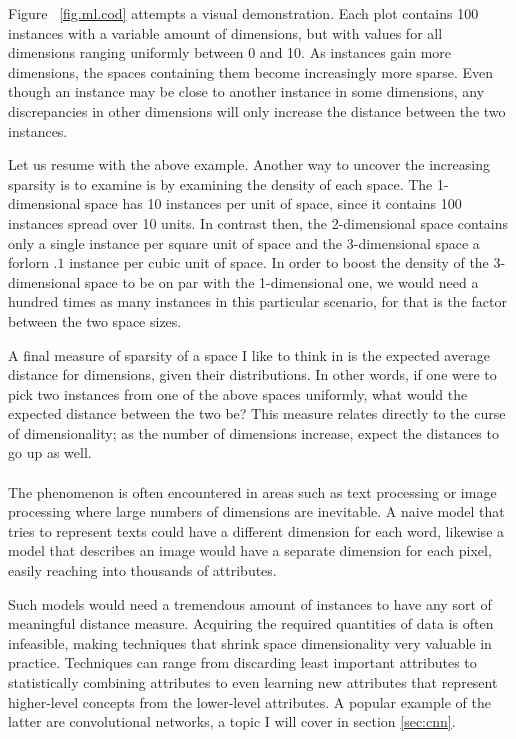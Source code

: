 Figure ~\ref{fig.ml.cod} attempts a visual demonstration.
Each plot contains 100 instances with a variable amount of dimensions,
but with values for all dimensions ranging uniformly between 0 and 10.
As instances gain more dimensions,
the spaces containing them become increasingly more sparse.
Even though an instance may be close to another instance
in some dimensions,
any discrepancies in other dimensions
will only increase the distance between the two instances.

Let us resume with the above example.
Another way to uncover the increasing sparsity is to examine
is by examining the density of each space.
The 1-dimensional space has 10 instances per unit of space,
since it contains 100 instances spread over 10 units.
In contrast then, the 2-dimensional space contains
only a single instance per square unit of space
and the 3-dimensional space a forlorn $.1$ instance
per cubic unit of space.
In order to boost the density of the 3-dimensional space
to be on par with the 1-dimensional one,
we would need a hundred times as many instances
in this particular scenario,
for that is the factor between the two space sizes.

A final measure of sparsity of a space I like to think in
is the expected average distance for dimensions,
given their distributions.
In other words,
if one were to pick two instances from one of the above spaces uniformly,
what would the expected distance between the two be?
This measure relates directly to the curse of dimensionality;
as the number of dimensions increase,
expect the distances to go up as well.

\paragraph{}
The phenomenon is often encountered in areas such as
text processing or image processing
where large numbers of dimensions are inevitable.
A naive model that tries to represent texts
could have a different dimension for each word,
likewise a model that describes an image
would have a separate dimension for each pixel,
easily reaching into thousands of attributes.

Such models would need a tremendous amount
of instances to have any sort of meaningful
distance measure.
Acquiring the required quantities of data
is often infeasible,
making techniques that shrink space dimensionality
very valuable in practice.
Techniques can range from discarding
least important attributes to
statistically combining attributes
to even learning new attributes that represent
higher-level concepts
from the lower-level attributes.
A popular example of the latter are
convolutional networks,
a topic I will cover in
section \ref{sec:cnn}.

